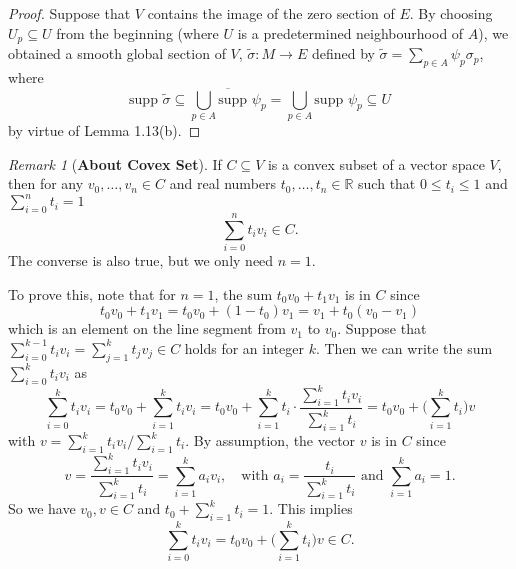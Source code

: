 \documentclass[a4paper]{article}
\theoremstyle{remark}
\newtheorem*{remark}{Remark}
\newcommand{\er}{\mathbb{R}} %
\newcommand{\subhim}{\subseteq} %
\newcommand\wtilde[1]{\widetilde{#1}} %
\begin{document}
\begin{proof}
Suppose that $V$ contains the image of the zero section of $E$. By choosing $U_p \subhim U$ from the beginning (where $U $ is a predetermined neighbourhood of $A$), we obtained a smooth global section of $V$, $\wtilde{\sigma} : M \to E$  defined by $\wtilde{\sigma} = \sum_{p \in A} \psi_p \sigma_p$, where 
$$
\text{supp } \wtilde{\sigma} \subhim \overline{\bigcup_{p \in A} \text{supp } \psi_p}  = \bigcup_{p \in A} \text{supp }\psi_p \subhim U
$$ 
by virtue of Lemma 1.13(b).
\end{proof}

\begin{remark}[\textbf{About Covex Set}]
If $C \subhim V$ is a convex subset of a vector space $V$, then for any $v_0,\dots,v_n \in C$ and real numbers $t_0,\dots,t_n \in \er$ such that $0 \leq t_i \leq 1$ and $\sum_{i=0}^{n} t_i = 1$
$$
\sum_{i=0}^{n}t_iv_i \in C.
$$
The converse is also true, but we only need $n=1$.

To prove this, note that for $n=1$, the sum $t_0 v_0 + t_1 v_1$ is in $C$ since 
$$
t_0v_0 + t_1 v_1 = t_0 v_0 + (1-t_0)v_1 = v_1 + t_0(v_0 -v_1) 
$$ 
which is an element on the line segment from $v_1$ to $v_0$. Suppose that $\sum_{i=0}^{k-1} t_iv_i = \sum_{j=1}^{k} t_jv_j \in C$ holds for an integer $k$. Then we can write the sum $\sum_{i=0}^{k}t_iv_i$ as
$$
\sum_{i=0}^{k}t_iv_i = t_0v_0 + \sum_{i=1}^{k}t_iv_i =  t_0v_0 + \sum_{i=1}^{k} t_i \cdot \frac{\sum_{i=1}^{k} t_i v_i}{\sum_{i=1}^{k} t_i} = t_0 v_0 + \big(\sum_{i=1}^{k} t_i \big) v
$$ 
with $v = \sum_{i=1}^{k} t_i v_i/\sum_{i=1}^{k} t_i$. By assumption, the vector $v$ is in $C$ since 
$$
v =  \frac{\sum_{i=1}^{k} t_i v_i}{\sum_{i=1}^{k} t_i} = \sum_{i=1}^{k} a_i v_i, \quad \text{with } a_i =  \frac{t_i}{\sum_{i=1}^{k} t_i} \text{ and }  \sum_{i=1}^{k} a_i = 1.
$$
So we have $v_0,v \in C$ and $t_0 + \sum_{i=1}^{k}t_i = 1$. This implies 
$$
\sum_{i=0}^{k}t_iv_i  = t_0 v_0 + \big(\sum_{i=1}^{k} t_i \big) v \in C. 
$$
\end{remark}
\end{document}
